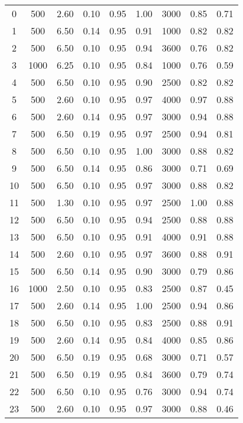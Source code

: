 \begin{longtable}[c]{ccccccccc}
0  &   500 &  2.60 &  0.10 &  0.95 &  1.00 &  3000 &  0.85 &  0.71 \\
1  &   500 &  6.50 &  0.14 &  0.95 &  0.91 &  1000 &  0.82 &  0.82 \\
2  &   500 &  6.50 &  0.10 &  0.95 &  0.94 &  3600 &  0.76 &  0.82 \\
3  &  1000 &  6.25 &  0.10 &  0.95 &  0.84 &  1000 &  0.76 &  0.59 \\
4  &   500 &  6.50 &  0.10 &  0.95 &  0.90 &  2500 &  0.82 &  0.82 \\
5  &   500 &  2.60 &  0.10 &  0.95 &  0.97 &  4000 &  0.97 &  0.88 \\
6  &   500 &  2.60 &  0.14 &  0.95 &  0.97 &  3000 &  0.94 &  0.88 \\
7  &   500 &  6.50 &  0.19 &  0.95 &  0.97 &  2500 &  0.94 &  0.81 \\
8  &   500 &  6.50 &  0.10 &  0.95 &  1.00 &  3000 &  0.88 &  0.82 \\
9  &   500 &  6.50 &  0.14 &  0.95 &  0.86 &  3000 &  0.71 &  0.69 \\
10 &   500 &  6.50 &  0.10 &  0.95 &  0.97 &  3000 &  0.88 &  0.82 \\
11 &   500 &  1.30 &  0.10 &  0.95 &  0.97 &  2500 &  1.00 &  0.88 \\
12 &   500 &  6.50 &  0.10 &  0.95 &  0.94 &  2500 &  0.88 &  0.88 \\
13 &   500 &  6.50 &  0.10 &  0.95 &  0.91 &  4000 &  0.91 &  0.88 \\
14 &   500 &  2.60 &  0.10 &  0.95 &  0.97 &  3600 &  0.88 &  0.91 \\
15 &   500 &  6.50 &  0.14 &  0.95 &  0.90 &  3000 &  0.79 &  0.86 \\
16 &  1000 &  2.50 &  0.10 &  0.95 &  0.83 &  2500 &  0.87 &  0.45 \\
17 &   500 &  2.60 &  0.14 &  0.95 &  1.00 &  2500 &  0.94 &  0.86 \\
18 &   500 &  6.50 &  0.10 &  0.95 &  0.83 &  2500 &  0.88 &  0.91 \\
19 &   500 &  2.60 &  0.14 &  0.95 &  0.84 &  4000 &  0.85 &  0.86 \\
20 &   500 &  6.50 &  0.19 &  0.95 &  0.68 &  3000 &  0.71 &  0.57 \\
21 &   500 &  6.50 &  0.19 &  0.95 &  0.84 &  3600 &  0.79 &  0.74 \\
22 &   500 &  6.50 &  0.10 &  0.95 &  0.76 &  3000 &  0.94 &  0.74 \\
23 &   500 &  2.60 &  0.10 &  0.95 &  0.97 &  3000 &  0.88 &  0.46 \\

\end{longtable}
